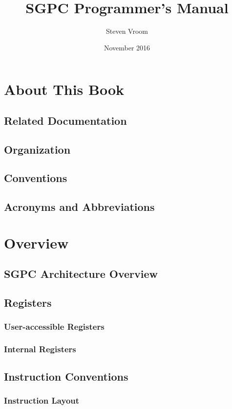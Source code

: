 \documentclass[twoside,a4paper]{memoir}
\begin{document}
\title{SGPC Programmer's Manual}
\author{Steven Vroom}
\date{November 2016}
\maketitle
\cleardoublepage
\tableofcontents
\cleardoublepage

\chapter*{About This Book}
\section*{Related Documentation}
\section*{Organization}
\section*{Conventions}
\section*{Acronyms and Abbreviations}

\chapter{Overview}
\section{SGPC Architecture Overview}
\section{Registers}
\subsection{User-accessible Registers}
\subsection{Internal Registers}
\section{Instruction Conventions}
\subsection{Instruction Layout}
\end{document}
